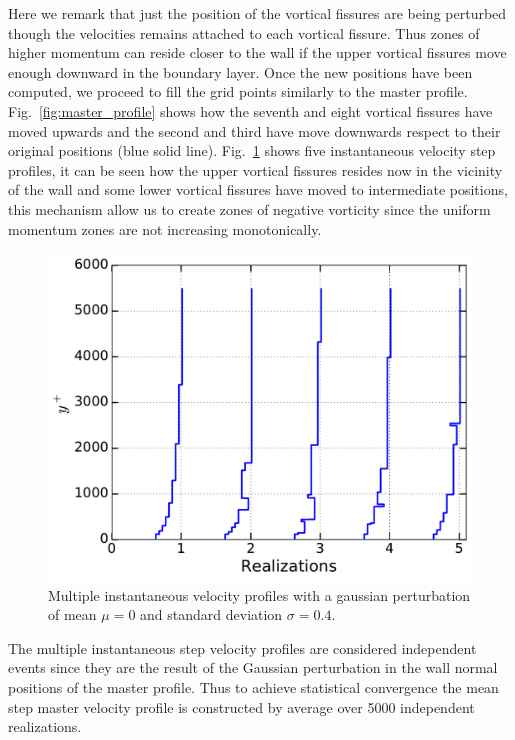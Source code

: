 \documentclass[aps,reprint,amsmath,amssymb,pra]{revtex4-1}%
\begin{document}
Here we remark that just the position of the vortical fissures are being perturbed though the velocities remains attached to each vortical fissure. Thus zones of higher momentum can reside closer to the wall if the upper vortical fissures move enough downward in the boundary layer. Once the new positions have been computed, we proceed to fill the grid points similarly to the master profile. Fig.~\ref{fig:master_profile} shows how the seventh and eight vortical fissures have moved upwards and the second and third have move downwards respect to their original positions (blue solid line).  Fig.~\ref{fig:mul_profiles} shows five instantaneous velocity step profiles,  it can be seen how the upper vortical fissures resides now in the vicinity of the wall and some lower vortical fissures have moved to intermediate positions, this mechanism allow us to create zones of negative vorticity since the  uniform momentum zones are not increasing monotonically. 
\begin{figure}[b]
\includegraphics[scale=0.46]{figures/multiple_instantaneous_vprof}
\caption{\label{fig:mul_profiles} Multiple instantaneous velocity profiles with a gaussian perturbation of mean $\mu=0$ and standard deviation $\sigma=0.4$.}
\end{figure}
The multiple instantaneous step velocity profiles are considered independent events since they are the result of the Gaussian perturbation in the wall normal positions of the master profile. Thus to achieve statistical convergence the mean step master velocity profile is constructed by average over 5000 independent realizations.
\end{document}
